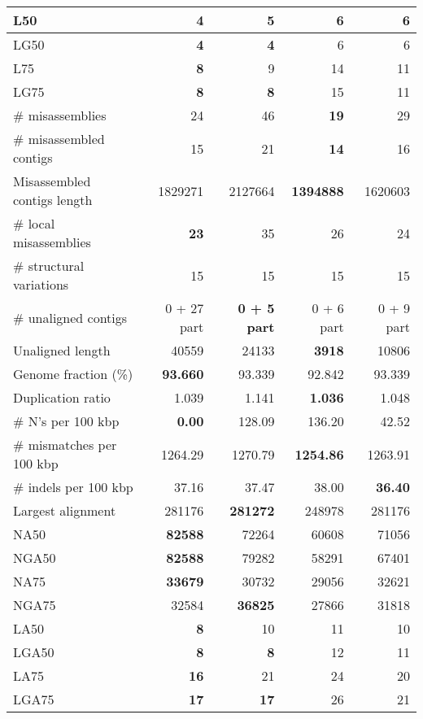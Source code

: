 \documentclass[12pt,a4paper]{article}
\begin{document}
\begin{table}[ht]
\begin{center}
\begin{tabular}{|l*{4}{|r}|}
L50 & {\bf 4} & 5 & 6 & 6 \\ \hline
LG50 & {\bf 4} & {\bf 4} & 6 & 6 \\ \hline
L75 & {\bf 8} & 9 & 14 & 11 \\ \hline
LG75 & {\bf 8} & {\bf 8} & 15 & 11 \\ \hline
\# misassemblies & 24 & 46 & {\bf 19} & 29 \\ \hline
\# misassembled contigs & 15 & 21 & {\bf 14} & 16 \\ \hline
Misassembled contigs length & 1829271 & 2127664 & {\bf 1394888} & 1620603 \\ \hline
\# local misassemblies & {\bf 23} & 35 & 26 & 24 \\ \hline
\# structural variations & 15 & 15 & 15 & 15 \\ \hline
\# unaligned contigs & 0 + 27 part & {\bf 0 + 5 part} & 0 + 6 part & 0 + 9 part \\ \hline
Unaligned length & 40559 & 24133 & {\bf 3918} & 10806 \\ \hline
Genome fraction (\%) & {\bf 93.660} & 93.339 & 92.842 & 93.339 \\ \hline
Duplication ratio & 1.039 & 1.141 & {\bf 1.036} & 1.048 \\ \hline
\# N's per 100 kbp & {\bf 0.00} & 128.09 & 136.20 & 42.52 \\ \hline
\# mismatches per 100 kbp & 1264.29 & 1270.79 & {\bf 1254.86} & 1263.91 \\ \hline
\# indels per 100 kbp & 37.16 & 37.47 & 38.00 & {\bf 36.40} \\ \hline
Largest alignment & 281176 & {\bf 281272} & 248978 & 281176 \\ \hline
NA50 & {\bf 82588} & 72264 & 60608 & 71056 \\ \hline
NGA50 & {\bf 82588} & 79282 & 58291 & 67401 \\ \hline
NA75 & {\bf 33679} & 30732 & 29056 & 32621 \\ \hline
NGA75 & 32584 & {\bf 36825} & 27866 & 31818 \\ \hline
LA50 & {\bf 8} & 10 & 11 & 10 \\ \hline
LGA50 & {\bf 8} & {\bf 8} & 12 & 11 \\ \hline
LA75 & {\bf 16} & 21 & 24 & 20 \\ \hline
LGA75 & {\bf 17} & {\bf 17} & 26 & 21 \\ \hline
\end{tabular}
\end{center}
\end{table}
\end{document}

